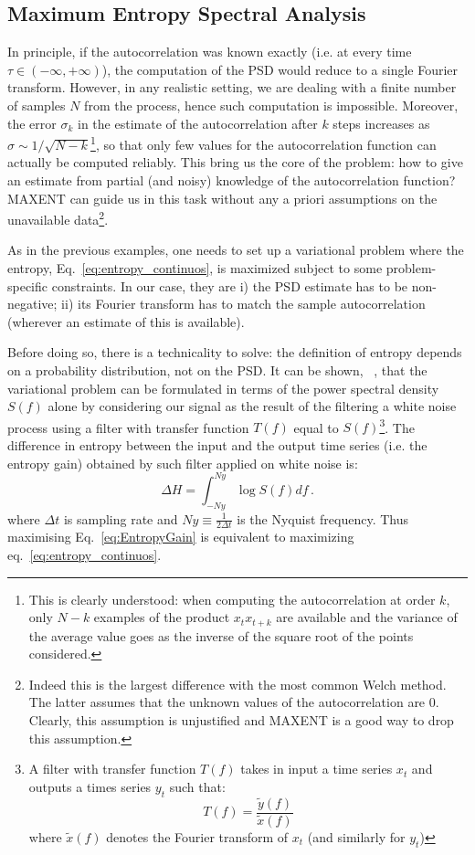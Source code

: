 \documentclass{aa}
\begin{document}
\subsection{Maximum Entropy Spectral Analysis} \label{sec:MESA}

In principle, if the autocorrelation was known exactly (i.e. at every time $\tau \in (-\infty,+\infty)$), the computation of the PSD 
would reduce to a single Fourier transform.
However, in any realistic setting, we are dealing with a finite number of samples $N$ from the process, hence such computation
is impossible.
Moreover, the error $\sigma_k$ in the estimate of the autocorrelation after $k$ steps increases as $\sigma \sim 1/\sqrt{N - k}$\footnote{
This is clearly understood: when computing the autocorrelation at order $k$, only $N-k$ examples of the product $x_t x_{t+k}$ are available and the variance of the average value goes as the inverse of the square root of the points considered.
}, so that only few values for the autocorrelation function can actually be computed reliably.
This bring us the core of the problem: how to give an estimate from partial (and noisy) knowledge of the autocorrelation function? MAXENT can guide us in this task without any a priori assumptions on the unavailable data\footnote{Indeed this is the largest difference with the most common Welch method. The latter assumes that the unknown values of the autocorrelation are $0$. Clearly, this assumption is unjustified and MAXENT is a good way to drop this assumption.}.

As in the previous examples, one needs to set up a variational problem where the entropy, Eq.~\eqref{eq:entropy_continuos}, is maximized 
subject to some problem-specific constraints. 
In our case, they are i) the PSD estimate has to be non-negative; ii) its Fourier transform has to match the sample autocorrelation (wherever an estimate of this is available).

Before doing so, there is a technicality to solve: the definition of entropy depends on a probability distribution, not on the PSD.
It can be shown, ~\citep[e.g.]{AblesMESA, Bartlett}, that the variational problem can be formulated in terms of the power spectral density $S(f)$ alone by considering our signal as the result of the filtering a white noise process using a filter with transfer function $T(f)$ equal to $S(f)$\footnote{
A filter with transfer function $T(f)$ takes in input a time series $x_t$ and outputs a times series $y_t$ such that:
$$T(f) = \frac{\tilde{y}(f)}{\tilde{x}(f)}$$
where $\tilde{x}(f)$ denotes the Fourier transform of $x_t$ (and similarly for $y_t$)
}.
The difference in entropy between the input and the output time series (i.e. the entropy gain) obtained by such filter applied on white noise is:
\begin{equation}\label{eq:EntropyGain}
    \Delta H = \int_{- Ny}^{Ny}\log S(f) df\,.
\end{equation}
where $\Delta t$ is sampling rate and $Ny \equiv \frac{1}{2 \Delta t}$  is the Nyquist frequency.
Thus maximising Eq.~\eqref{eq:EntropyGain} is equivalent to maximizing eq.~\eqref{eq:entropy_continuos}.
\end{document}

